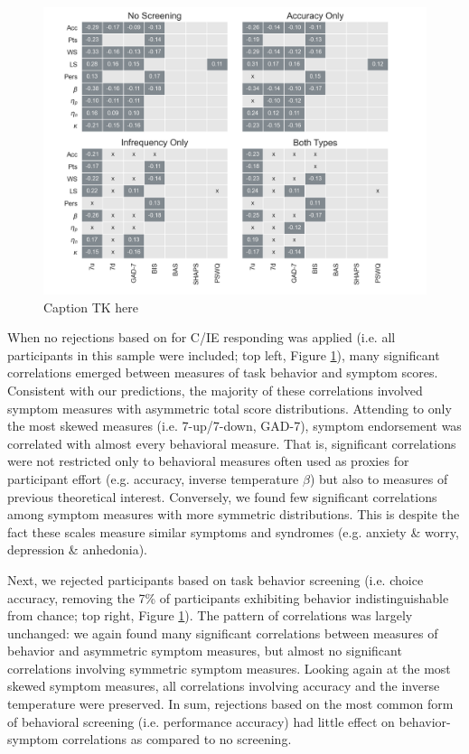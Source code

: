 \documentclass[a4paper,notitlepage,12pt]{article}
\begin{document}
\begin{figure}[!t]
\includegraphics[width=16cm]{../figures/main_03a.png}
\centering
\caption{Caption TK here}
\label{fig:correlations}
\end{figure}

When no rejections based on for C/IE responding was applied (i.e. all participants in this sample were included; top left, Figure \ref{fig:correlations}), many significant correlations emerged between measures of task behavior and symptom scores. Consistent with our predictions, the majority of these correlations involved symptom measures with asymmetric total score distributions. Attending to only the most skewed measures (i.e. 7-up/7-down, GAD-7), symptom endorsement was correlated with almost every behavioral measure. That is, significant correlations were not restricted only to behavioral measures often used as proxies for participant effort (e.g. accuracy, inverse temperature $\beta$) but also to measures of previous theoretical interest. Conversely, we found few significant correlations among symptom measures with more symmetric distributions. This is despite the fact these scales measure similar symptoms and syndromes (e.g. anxiety \& worry, depression \& anhedonia). 

Next, we rejected participants based on task behavior screening (i.e. choice accuracy, removing the 7\% of participants exhibiting behavior indistinguishable from chance; top right, Figure \ref{fig:correlations}). The pattern of correlations was largely unchanged: we again found many significant correlations between measures of behavior and asymmetric symptom measures, but almost no significant correlations involving symmetric symptom measures. Looking again at the most skewed symptom measures, all correlations involving accuracy and the inverse temperature were preserved. In sum, rejections based on the most common form of behavioral screening (i.e. performance accuracy) had little effect on behavior-symptom correlations as compared to no screening.  
\end{document}
